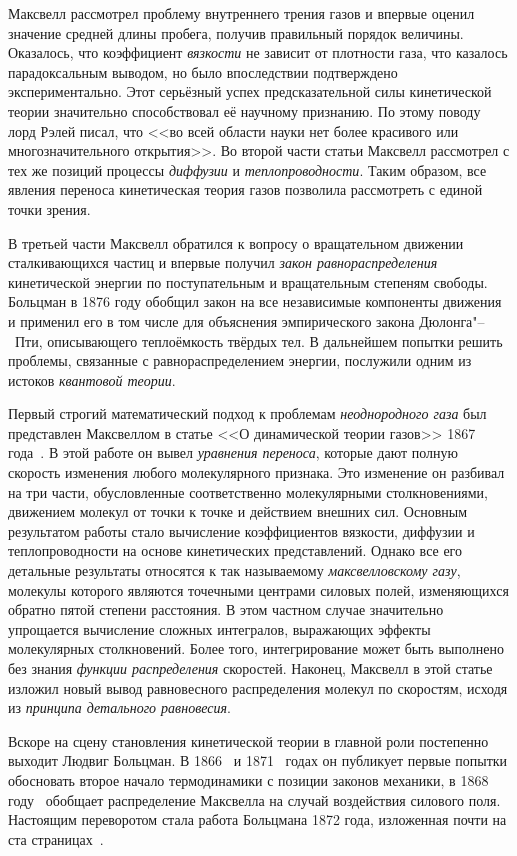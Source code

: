 \documentclass[a4paper, 12pt, oneside]{article} %
\begin{document}
Максвелл рассмотрел проблему внутреннего трения газов и впервые оценил
значение средней длины пробега, получив правильный порядок величины.
Оказалось, что коэффициент \emph{вязкости} не зависит от плотности газа,
что казалось парадоксальным выводом, но было впоследствии подтверждено
экспериментально. Этот серьёзный успех предсказательной силы
кинетической теории значительно способствовал её научному признанию. По
этому поводу лорд Рэлей писал, что <<во всей области науки нет более
красивого или многозначительного открытия>>. Во второй части статьи
Максвелл рассмотрел с тех же позиций процессы \emph{диффузии} и
\emph{теплопроводности}. Таким образом, все явления переноса
кинетическая теория газов позволила рассмотреть с единой точки зрения.

В третьей части Максвелл обратился к вопросу о вращательном движении
сталкивающихся частиц и впервые получил \emph{закон равнораспределения}
кинетической энергии по поступательным и вращательным степеням свободы.
Больцман в 1876 году обобщил закон на все независимые компоненты
движения и применил его в том числе для объяснения эмпирического закона
Дюлонга"--~Пти, описывающего теплоёмкость твёрдых тел. В дальнейшем
попытки решить проблемы, связанные с равнораспределением энергии,
послужили одним из истоков \emph{квантовой теории}.

Первый строгий математический подход к проблемам \emph{неоднородного
газа} был представлен Максвеллом в статье <<О динамической теории
газов>> 1867 года~\cite{maxwell2012theory}. В этой работе он вывел
\emph{уравнения переноса}, которые дают полную скорость изменения любого
молекулярного признака. Это изменение он разбивал на три части,
обусловленные соответственно молекулярными столкновениями, движением
молекул от точки к точке и действием внешних сил. Основным результатом
работы стало вычисление коэффициентов вязкости, диффузии и
теплопроводности на основе кинетических представлений. Однако все его
детальные результаты относятся к так называемому \emph{максвелловскому
газу}, молекулы которого являются точечными центрами силовых полей,
изменяющихся обратно пятой степени расстояния. В этом частном случае
значительно упрощается вычисление сложных интегралов, выражающих эффекты
молекулярных столкновений. Более того, интегрирование может быть
выполнено без знания \emph{функции распределения }скоростей. Наконец,
Максвелл в этой статье изложил новый вывод равновесного распределения
молекул по скоростям, исходя из \emph{принципа детального равновесия}.

Вскоре на сцену становления кинетической теории в главной роли
постепенно выходит Людвиг Больцман. В 1866~\cite{boltzmann1866second} и
1871~\cite{boltzmann1871equilibrium} годах он публикует первые попытки
обосновать второе начало термодинамики с позиции законов механики, в
1868 году~\cite{boltzmann1868distribution} обобщает распределение
Максвелла на случай воздействия силового поля. Настоящим переворотом
стала работа Больцмана 1872 года, изложенная почти на ста
страницах~\cite{boltzmann1872further}.
\end{document}
